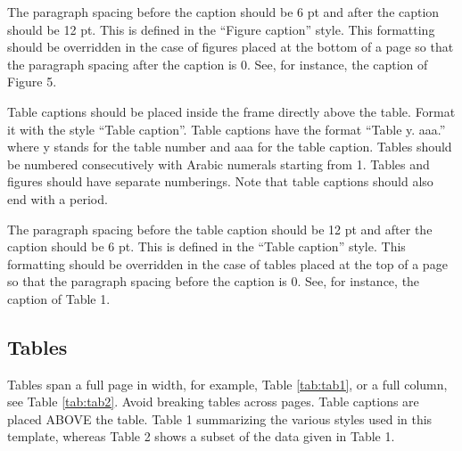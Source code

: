 \documentclass[10pt]{imeko_acta}
\begin{document}
The paragraph spacing before the caption should be 6 pt and after the caption should be 12 pt. This is defined in the “Figure caption” style. This formatting should be overridden in the case of figures placed at the bottom of a page so that the paragraph spacing after the caption is 0. See, for instance, the caption of Figure 5.

Table captions should be placed inside the frame directly above the table. Format it with the style “Table caption”. Table captions have the format “Table y. aaa.” where y stands for the table number and aaa for the table caption. Tables should be numbered consecutively with Arabic numerals starting from 1. Tables and figures should have separate numberings. Note that table captions should also end with a period. 

The paragraph spacing before the table caption should be 12 pt and after the caption should be 6 pt. This is defined in the “Table caption” style. This formatting should be overridden in the case of tables placed at the top of a page so that the paragraph spacing before the caption is 0. See, for instance, the caption of Table 1.


\subsection{Tables}

Tables span a full page in width, for example, Table \ref{tab:tab1}, or a full column, see Table \ref{tab:tab2}. Avoid breaking tables across pages.
Table captions are placed ABOVE the table. 
Table 1 summarizing the various styles used in this template, whereas Table 2 shows a subset of the data given in Table 1.
\end{document}

